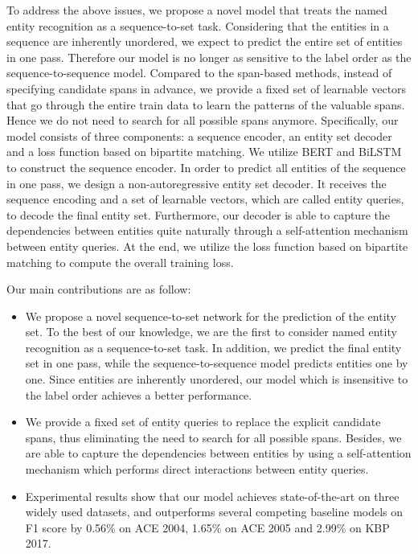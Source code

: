 \documentclass{article}
\begin{document}
To address the above issues, we propose a novel model that treats the named entity recognition as a sequence-to-set task. Considering that the entities in a sequence are inherently unordered, we expect to predict the entire set of entities in one pass. Therefore our model is no longer as sensitive to the label order as the sequence-to-sequence model. Compared to the span-based methods, instead of specifying candidate spans in advance, we provide a fixed set of learnable vectors that go through the entire train data to learn the patterns of the valuable spans. Hence we do not need to search for all possible spans anymore. Specifically, our model consists of three components: a sequence encoder, an entity set decoder and a loss function based on bipartite matching. We utilize BERT \cite{devlin-etal-2019-bert} and BiLSTM \cite{huang2015bidirectional} to construct the sequence encoder. In order to predict all entities of the sequence in one pass, we design a non-autoregressive entity set decoder. It receives the sequence encoding and a set of learnable vectors, which are called entity queries, to decode the final entity set. Furthermore, our decoder is able to capture the dependencies between entities quite naturally through a self-attention mechanism between entity queries. At the end, we utilize the loss function based on bipartite matching to compute the overall training loss.

Our main contributions are as follow:

\begin{itemize}
    \item We propose a novel sequence-to-set network for the prediction of the entity set. To the best of our knowledge, we are the first to consider named entity recognition as a sequence-to-set task. In addition, we predict the final entity set in one pass, while the sequence-to-sequence model predicts entities one by one. Since entities are inherently unordered, our model which is insensitive to the label order achieves a better performance.
    \item We provide a fixed set of entity queries to replace the explicit candidate spans, thus eliminating the need to search for all possible spans. Besides, 
we are able to capture the dependencies between entities by using a self-attention mechanism which performs direct interactions between entity queries.
    \item Experimental results show that our model achieves state-of-the-art 
on three widely used datasets, and outperforms several competing baseline models on F1 score by 0.56\% on ACE 2004, 1.65\% on ACE 2005
and 2.99\% on KBP 2017.
\end{itemize}
\end{document}

